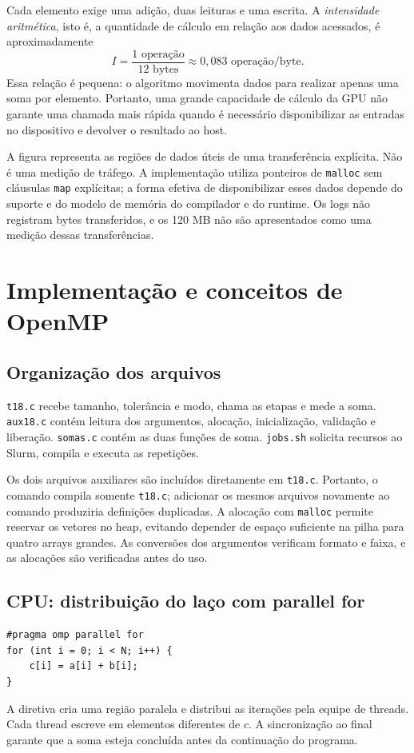 \documentclass[12pt,a4paper]{article}
\begin{document}
Cada elemento exige uma adição, duas leituras e uma escrita. A \textit{intensidade aritmética}, isto é, a quantidade de cálculo em relação aos dados acessados, é aproximadamente
\[
I=\frac{1\text{ operação}}{12\text{ bytes}}
\approx0{,}083\text{ operação/byte}.
\]
Essa relação é pequena: o algoritmo movimenta dados para realizar apenas uma soma por elemento. Portanto, uma grande capacidade de cálculo da GPU não garante uma chamada mais rápida quando é necessário disponibilizar as entradas no dispositivo e devolver o resultado ao host.



A figura representa as regiões de dados úteis de uma transferência explícita. Não é uma medição de tráfego. A implementação utiliza ponteiros de \texttt{malloc} sem cláusulas \texttt{map} explícitas; a forma efetiva de disponibilizar esses dados depende do suporte e do modelo de memória do compilador e do runtime. Os logs não registram bytes transferidos, e os 120 MB não são apresentados como uma medição dessas transferências.

\section{Implementação e conceitos de OpenMP}
\subsection{Organização dos arquivos}
\texttt{t18.c} recebe tamanho, tolerância e modo, chama as etapas e mede a soma. \texttt{aux18.c} contém leitura dos argumentos, alocação, inicialização, validação e liberação. \texttt{somas.c} contém as duas funções de soma. \texttt{jobs.sh} solicita recursos ao Slurm, compila e executa as repetições.

Os dois arquivos auxiliares são incluídos diretamente em \texttt{t18.c}. Portanto, o comando compila somente \texttt{t18.c}; adicionar os mesmos arquivos novamente ao comando produziria definições duplicadas. A alocação com \texttt{malloc} permite reservar os vetores no heap, evitando depender de espaço suficiente na pilha para quatro arrays grandes. As conversões dos argumentos verificam formato e faixa, e as alocações são verificadas antes do uso.

\subsection{CPU: distribuição do laço com parallel for}
\begin{lstlisting}[style=CStyle]
#pragma omp parallel for
for (int i = 0; i < N; i++) {
    c[i] = a[i] + b[i];
}
\end{lstlisting}
A diretiva cria uma região paralela e distribui as iterações pela equipe de threads. Cada thread escreve em elementos diferentes de $c$. A sincronização ao final garante que a soma esteja concluída antes da continuação do programa.
\end{document}
